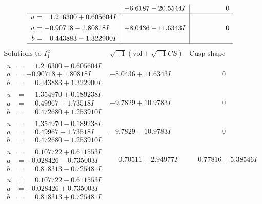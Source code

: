 \documentclass[1p]{elsarticle_modified}
\theoremstyle{definition}
\newcommand{\I}{\sqrt{-1}}
\begin{document}
$$\begin{array}{c|c|c}
 & -6.6187 - 20.5544 I & \phantom{-0.000000 } 0 \\ \hline\begin{aligned}
u &= \phantom{-}1.216300 + 0.605604 I \\
a &= -0.90718 - 1.80818 I \\
b &= \phantom{-}0.443883 - 1.322900 I\end{aligned}
 & -8.0436 - 11.6343 I & \phantom{-0.000000 } 0\\
 \hline 
 \end{array}$$\newpage$$\begin{array}{c|c|c}  
\text{Solutions to }I^u_{1}& \I (\text{vol} + \sqrt{-1}CS) & \text{Cusp shape}\\
 \hline 
\begin{aligned}
u &= \phantom{-}1.216300 - 0.605604 I \\
a &= -0.90718 + 1.80818 I \\
b &= \phantom{-}0.443883 + 1.322900 I\end{aligned}
 & -8.0436 + 11.6343 I & \phantom{-0.000000 } 0 \\ \hline\begin{aligned}
u &= \phantom{-}1.354970 + 0.189238 I \\
a &= \phantom{-}0.49967 + 1.73518 I \\
b &= \phantom{-}0.472680 + 1.253910 I\end{aligned}
 & -9.7829 + 10.9783 I & \phantom{-0.000000 } 0 \\ \hline\begin{aligned}
u &= \phantom{-}1.354970 - 0.189238 I \\
a &= \phantom{-}0.49967 - 1.73518 I \\
b &= \phantom{-}0.472680 - 1.253910 I\end{aligned}
 & -9.7829 - 10.9783 I & \phantom{-0.000000 } 0 \\ \hline\begin{aligned}
u &= \phantom{-}0.107722 + 0.611553 I \\
a &= -0.028426 - 0.735003 I \\
b &= \phantom{-}0.818313 - 0.725481 I\end{aligned}
 & \phantom{-}0.70511 - 2.94977 I & \phantom{-}0.77816 + 5.38546 I \\ \hline\begin{aligned}
u &= \phantom{-}0.107722 - 0.611553 I \\
a &= -0.028426 + 0.735003 I \\
b &= \phantom{-}0.818313 + 0.725481 I\end{aligned}

\end{array}$$
\end{document}

